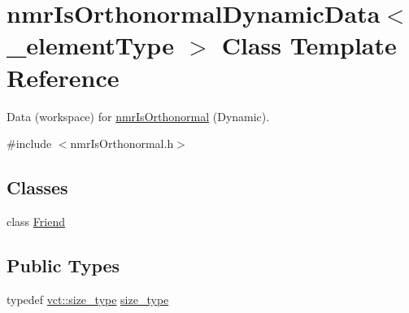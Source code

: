 \hypertarget{classnmr_is_orthonormal_dynamic_data}{}\section{nmr\+Is\+Orthonormal\+Dynamic\+Data$<$ \+\_\+element\+Type $>$ Class Template Reference}
\label{classnmr_is_orthonormal_dynamic_data}


Data (workspace) for \hyperlink{nmr_is_orthonormal_8h_acf0ff1e2dbe0c988db04d9db1e2e7697}{nmr\+Is\+Orthonormal} (Dynamic).  




{\ttfamily \#include $<$nmr\+Is\+Orthonormal.\+h$>$}

\subsection*{Classes}
\begin{DoxyCompactItemize}
\item 
class \hyperlink{classnmr_is_orthonormal_dynamic_data_1_1_friend}{Friend}
\end{DoxyCompactItemize}
\subsection*{Public Types}
\begin{DoxyCompactItemize}
\item 
typedef \hyperlink{namespacevct_a3e2935e13aac4500965e00d30565775b}{vct\+::size\+\_\+type} \hyperlink{classnmr_is_orthonormal_dynamic_data_ae69581f9b270b49b1cd1d16ff29a5409}{size\+\_\+type}
\end{DoxyCompactItemize}
